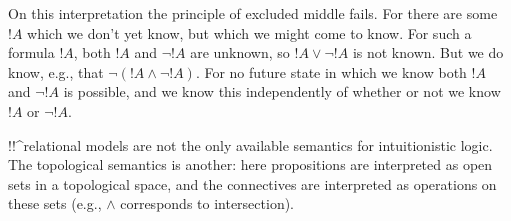 \documentclass[../../../include/open-logic-section]{subfiles}
\begin{document}
On this interpretation the principle of excluded middle fails. For
there are some $!A$ which we don't yet know, but which we might come
to know. For such a formula $!A$, both $!A$ and $\lnot !A$ are unknown, so
$!A \lor \lnot !A$ is not known. But we do know, e.g., that $\lnot(!A
\land \lnot !A)$. For no future state in which we know both $!A$ and
$\lnot !A$ is possible, and we know this independently of whether or
not we know~$!A$ or $\lnot !A$.

!!^{relational model}s are not the only available semantics for
intuitionistic logic. The topological semantics is another: here
propositions are interpreted as open sets in a topological space, and
the connectives are interpreted as operations on these sets (e.g.,
$\land$ corresponds to intersection).
\end{document}

